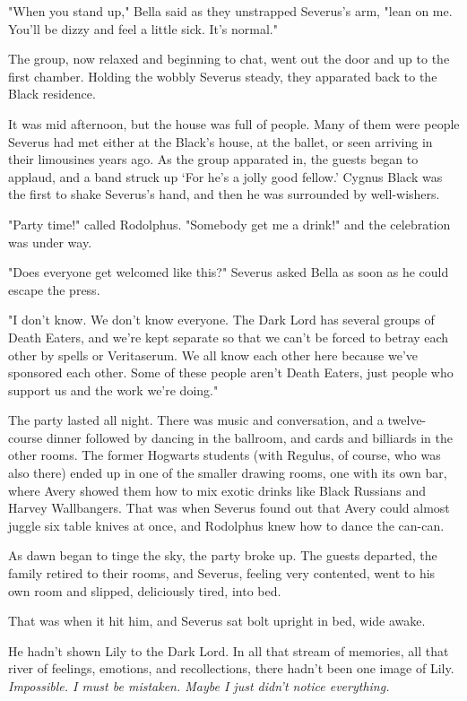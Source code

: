 "When you stand up," Bella said as they unstrapped Severus's arm, "lean on me. You'll be dizzy and feel a little sick. It's normal."

The group, now relaxed and beginning to chat, went out the door and up to the first chamber. Holding the wobbly Severus steady, they apparated back to the Black residence.

It was mid afternoon, but the house was full of people. Many of them were people Severus had met either at the Black's house, at the ballet, or seen arriving in their limousines years ago. As the group apparated in, the guests began to applaud, and a band struck up `For he's a jolly good fellow.' Cygnus Black was the first to shake Severus's hand, and then he was surrounded by well-wishers.

"Party time!" called Rodolphus. "Somebody get me a drink!" and the celebration was under way.

"Does everyone get welcomed like this?" Severus asked Bella as soon as he could escape the press.

"I don't know. We don't know everyone. The Dark Lord has several groups of Death Eaters, and we're kept separate so that we can't be forced to betray each other by spells or Veritaserum. We all know each other here because we've sponsored each other. Some of these people aren't Death Eaters, just people who support us and the work we're doing."

The party lasted all night. There was music and conversation, and a twelve-course dinner followed by dancing in the ballroom, and cards and billiards in the other rooms. The former Hogwarts students (with Regulus, of course, who was also there) ended up in one of the smaller drawing rooms, one with its own bar, where Avery showed them how to mix exotic drinks like Black Russians and Harvey Wallbangers. That was when Severus found out that Avery could almost juggle six table knives at once, and Rodolphus knew how to dance the can-can.

As dawn began to tinge the sky, the party broke up. The guests departed, the family retired to their rooms, and Severus, feeling very contented, went to his own room and slipped, deliciously tired, into bed.

That was when it hit him, and Severus sat bolt upright in bed, wide awake.

He hadn't shown Lily to the Dark Lord. In all that stream of memories, all that river of feelings, emotions, and recollections, there hadn't been one image of Lily. \emph{Impossible. I must be mistaken. Maybe I just didn't notice everything.}

